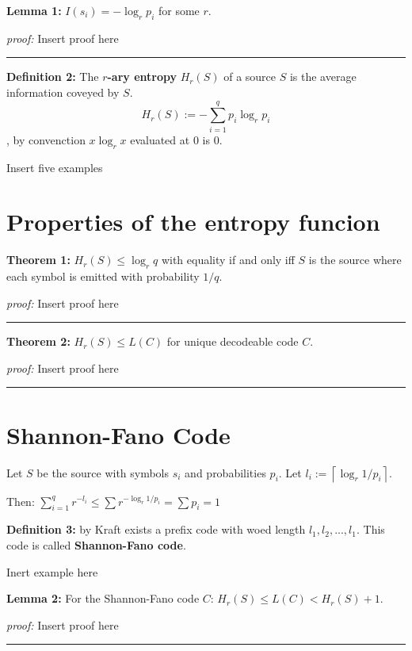 \documentclass{article}
\begin{document}
\noindent\textbf{Lemma 	1: } $I(s_i) = - \log_{r}{p_i}$ for some $r$.

\noindent\textit{proof:}  Insert proof here

\noindent
{\color{gray} \rule{\linewidth}{0.5mm} }

\noindent \textbf{Definition 	2:} The \textbf{$r$-ary entropy} $H_{r}(S)$ of a source $S$ is the average information coveyed by $S$.
$$
H_{r}(S) := - \sum_{i = 1}^{q} {p_i \log_{r}{p_i}}
$$
, by convenction $x \log_{r}{x}$ evaluated at $0$ is $0$.

Insert five examples

	\section{Properties of the entropy funcion}
	
\noindent \textbf{Theorem  1:}  $H_{r}(S) \leq \log_{r}{q}$ with equality if and only iff $S$ is the source where each symbol is emitted with probability $1/q$.

\noindent\textit{proof:}  Insert proof here

\noindent
{\color{gray} \rule{\linewidth}{0.5mm} }

\noindent \textbf{Theorem  2:}  $H_{r}(S) \leq L(C)$ for unique decodeable code $C$.

\noindent\textit{proof:}  Insert proof here

\noindent
{\color{gray} \rule{\linewidth}{0.5mm} }


	\section{Shannon-Fano Code}

\noindent Let $S$ be the source with symbols $s_i$ and probabilities $p_i$. Let $l_i := \left\lceil \log_{r}{1/p_i} \right\rceil$. 


\noindent Then: $\sum_{i = 1}^{q}{r^{-l_i}} \leq \sum r^{- \log_{r}{1/p_i}} = \sum p_i = 1$

\noindent \textbf{Definition 	3:} by Kraft exists a prefix code with woed length $l_1, l_2, ..., l_1$. This code is called \textbf{Shannon-Fano code}.

Inert example here


\noindent \textbf{Lemma 	2:}  For the Shannon-Fano code $C$: $H_{r}(S) \leq L(C) < H_{r}(S) + 1$.

\noindent\textit{proof:}  Insert proof here

\noindent
{\color{gray} \rule{\linewidth}{0.5mm} }
\end{document}
